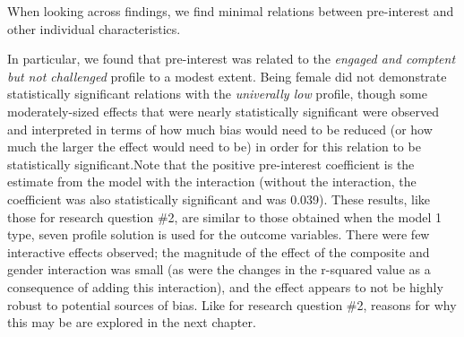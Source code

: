 \documentclass[]{msu-thesis}
\theoremstyle{definition}
\theoremstyle{definition}
\theoremstyle{definition}
\theoremstyle{remark}
\begin{document}
When looking across findings, we find minimal relations between
pre-interest and other individual characteristics.

\begin{landscape}\begin{table}

\caption{\label{tab:unnamed-chunk-16}Summary of results for research question 4}
\centering
{}
\end{table}
\end{landscape}

In particular, we found that pre-interest was related to the
\emph{engaged and comptent but not challenged} profile to a modest
extent. Being female did not demonstrate statistically significant
relations with the \emph{univerally low} profile, though some
moderately-sized effects that were nearly statistically significant were
observed and interpreted in terms of how much bias would need to be
reduced (or how much the larger the effect would need to be) in order
for this relation to be statistically significant.Note that the positive
pre-interest coefficient is the estimate from the model with the
interaction (without the interaction, the coefficient was also
statistically significant and was 0.039). These results, like those for
research question \#2, are similar to those obtained when the model 1
type, seven profile solution is used for the outcome variables. There
were few interactive effects observed; the magnitude of the effect of
the composite and gender interaction was small (as were the changes in
the r-squared value as a consequence of adding this interaction), and
the effect appears to not be highly robust to potential sources of bias.
Like for research question \#2, reasons for why this may be are explored
in the next chapter.
\end{document}
